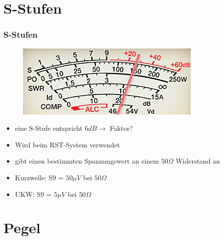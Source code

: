 \section*{S-Stufen}
\begin{frame}
  \frametitle{S-Stufen}
  \begin{center}
    \begin{figure}
      \includegraphics[width=\textwidth,height=.4\textheight,keepaspectratio]{e10/S-Meter.jpg}
    \end{figure}
    \begin{itemize}
      \item eine S-Stufe entspricht $6 dB \rightarrow$ Faktor?
      \item Wird beim RST-System verwendet
      \item gibt einen bestimmten Spannungswert an einem $50\Omega$ Widerstand an
      \item Kurzwelle: S9 = $50\mu V$ bei $50\Omega$
      \item UKW: S9 = $5\mu V$ bei $50\Omega$
    \end{itemize}
  \end{center}
\end{frame}

\section{Pegel}

